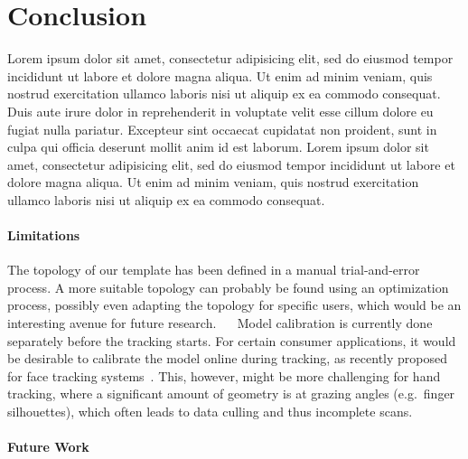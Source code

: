 \section{Conclusion}
\label{sec:conclusion}

\begin{DRAFT}
Lorem ipsum dolor sit amet, consectetur adipisicing elit, sed do eiusmod tempor incididunt ut labore et dolore magna aliqua. Ut enim ad minim veniam, quis nostrud exercitation ullamco laboris nisi ut aliquip ex ea commodo consequat. Duis aute irure dolor in reprehenderit in voluptate velit esse cillum dolore eu fugiat nulla pariatur. Excepteur sint occaecat cupidatat non proident, sunt in culpa qui officia deserunt mollit anim id est laborum.
Lorem ipsum dolor sit amet, consectetur adipisicing elit, sed do eiusmod tempor incididunt ut labore et dolore magna aliqua. Ut enim ad minim veniam, quis nostrud exercitation ullamco laboris nisi ut aliquip ex ea commodo consequat. \end{DRAFT}



\paragraph{Limitations} 
The topology of our template has been defined in a manual trial-and-error process. A more suitable topology can probably be found using an optimization process, possibly even adapting the topology for specific users, which would be an interesting avenue for future research. $\quad$ Model calibration is currently done separately before the tracking starts. For certain consumer applications, it would be desirable to calibrate the model online during tracking, as recently proposed for face tracking systems~\cite{bouaziz2013online}. This, however, might be more challenging for hand tracking, where a significant amount of geometry is at grazing angles (e.g.\ finger silhouettes), which often leads to data culling and thus incomplete scans.

\paragraph{Future Work}


